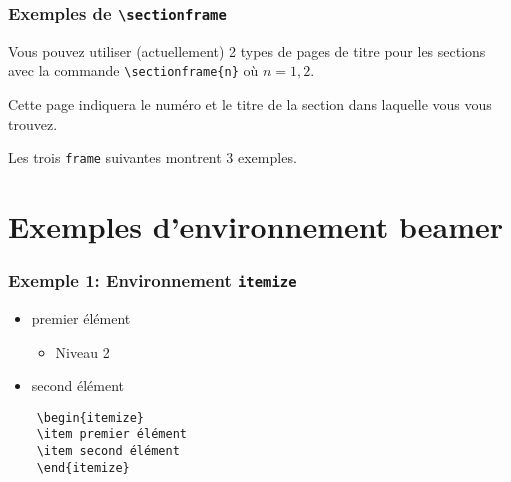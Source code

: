 \documentclass[aspectratio=169]{beamer}
\begin{document}
\begin{frame} 
    \frametitle{Exemples de \texttt{\textbackslash sectionframe}}

    Vous pouvez utiliser (actuellement) 2 types de pages de titre pour
    les sections avec la commande \texttt{\textbackslash sectionframe\{n\}} 
    où $n=1,2$.\newline

    Cette page indiquera le numéro et le titre de la section dans laquelle
    vous vous trouvez.\newline

    Les trois \texttt{frame} suivantes montrent 3 exemples.
\end{frame}

\section{Exemples d'environnement beamer}

\begin{frame}[fragile]
    \frametitle{Exemple 1: Environnement \texttt{itemize}}
\begin{itemize}
    \item premier élément 
        \begin{itemize}
            \item Niveau 2
        \end{itemize}
    \item second élément
\end{itemize}
\begin{verbatim}
    \begin{itemize}
    \item premier élément 
    \item second élément
    \end{itemize}
\end{verbatim}
\end{frame}
\end{document}
